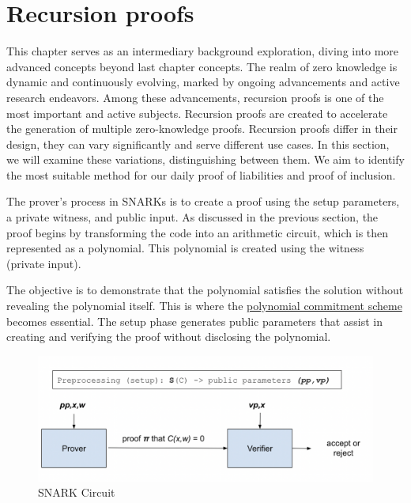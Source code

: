 

\chapter{Recursion proofs}

This chapter serves as an intermediary background exploration,
diving into more advanced concepts beyond last chapter concepts.
The realm of zero knowledge is dynamic and continuously evolving,
marked by ongoing advancements and active research endeavors. Among these advancements,
recursion proofs is one of the most important and active subjects. Recursion proofs are created to accelerate
the generation of multiple zero-knowledge proofs.
Recursion proofs differ in their design, they can vary significantly and serve different use cases.
In this section, we will examine these variations, distinguishing between them.
We aim to identify the most suitable method for our daily proof of liabilities and proof of inclusion. \cite{Nova23}



The prover's process in SNARKs is to create a proof using the setup parameters, a private witness, and public input. 
As discussed in the previous section, the proof begins by transforming the code into an arithmetic circuit, 
which is then represented as a polynomial. This polynomial is created using the witness (private input).

The objective is to demonstrate that the polynomial satisfies the solution without revealing the polynomial itself. 
This is where the \hyperref[subsec]{polynomial commitment scheme} becomes essential. 
The setup phase generates public parameters that assist in creating and verifying the proof without disclosing the polynomial.

\begin{figure}[H]
\centering
\includegraphics[width=130mm]{SNARKCircuit.png}
\caption{SNARK Circuit \cite{ZKM2}}
\label{overflow}
\end{figure}


